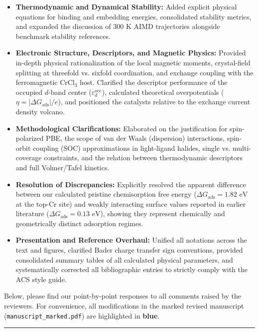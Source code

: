 \documentclass[11pt, sans, a4paper]{moderncv}
\begin{document}
\begin{itemize}[leftmargin=1.5em, itemsep=0.3em]
  \item \textbf{Thermodynamic and Dynamical Stability:} Added explicit physical equations for binding and embedding energies, consolidated stability metrics, and expanded the discussion of $300\text{ K}$ AIMD trajectories alongside benchmark stability references.
  \item \textbf{Electronic Structure, Descriptors, and Magnetic Physics:} Provided in-depth physical rationalization of the local magnetic moments, crystal-field splitting at threefold vs. sixfold coordination, and exchange coupling with the ferromagnetic $\text{CrCl}_3$ host. Clarified the descriptor performance of the occupied $d$-band center ($\varepsilon_d^{\mathrm{occ}}$), calculated theoretical overpotentials ($\eta = |\Delta G_{\mathrm{ads}}|/e$), and positioned the catalysts relative to the exchange current density volcano.
  \item \textbf{Methodological Clarifications:} Elaborated on the justification for spin-polarized PBE, the scope of van der Waals (dispersion) interactions, spin-orbit coupling (SOC) approximations in light-ligand halides, single vs. multi-coverage constraints, and the relation between thermodynamic descriptors and full Volmer/Tafel kinetics.
  \item \textbf{Resolution of Discrepancies:} Explicitly resolved the apparent difference between our calculated pristine chemisorption free energy ($\Delta G_{\mathrm{ads}} = 1.82\text{ eV}$ at the top-Cr site) and weakly interacting surface values reported in earlier literature ($\Delta G_{\mathrm{ads}} = 0.13\text{ eV}$), showing they represent chemically and geometrically distinct adsorption regimes.
  \item \textbf{Presentation and Reference Overhaul:} Unified all notations across the text and figures, clarified Bader charge transfer sign conventions, provided consolidated summary tables of all calculated physical parameters, and systematically corrected all bibliographic entries to strictly comply with the ACS style guide.
\end{itemize}

Below, please find our point-by-point responses to all comments raised by the reviewers. For convenience, all modifications in the marked revised manuscript (\texttt{manuscript\_marked.pdf}) are highlighted in \textbf{\color{blue}blue}.

\vspace{1.5em}
\noindent\rule{\textwidth}{0.6pt}
\end{document}
